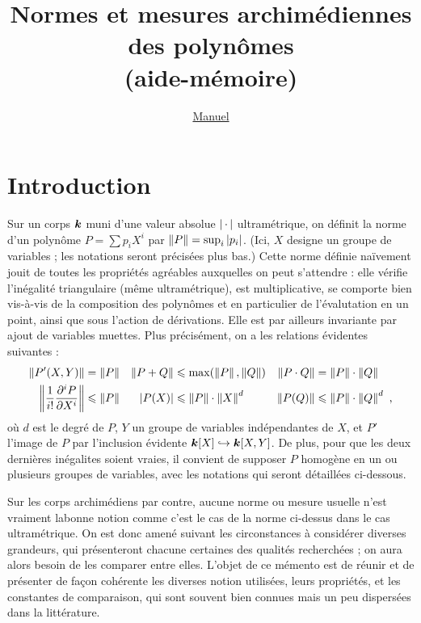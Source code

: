 \documentclass[11pt, twoside, a4paper]{article}
\author{\href{http://math.jussieu.fr/~mpg/}{Manuel \bsc{Pégourié-Gonnard}}}
\title{Normes et mesures archimédiennes des polynômes \\ (aide-mémoire)}
\begin{document}
\maketitle

\section*{Introduction}

Sur un corps $\boldsymbol{k}$ muni d'une valeur absolue $\left\lvert{\,\cdot\,}\right\rvert$ ultramétrique, on
définit la norme d'un polynôme $P = \sum p_i X^i$ par $\left\lVert P\right\rVert = \sup_i
\left\lvert p_i\right\rvert$. (Ici, $X$ designe un groupe de variables ; les notations seront
précisées plus bas.) Cette norme définie naïvement jouit de toutes les
propriétés agréables auxquelles on peut s'attendre : elle vérifie l'inégalité
triangulaire (même ultramétrique), est multiplicative, se comporte bien
vis-à-vis de la composition des polynômes et en particulier de l'évalutation
en un point, ainsi que sous l'action de dérivations. Elle est par ailleurs
invariante par ajout de variables muettes. Plus précisément, on a les
relations évidentes suivantes :
\begin{align*}
  \left\lVert P'(X, Y)\right\rVert 
  & = \left\lVert P\right\rVert 	
  & 
  \left\lVert P+Q\right\rVert 
  & \leqslant \max (\left\lVert P\right\rVert, \left\lVert Q\right\rVert)	
  &
  \left\lVert P\cdot Q\right\rVert 
  & = \left\lVert P\right\rVert \cdot \left\lVert Q\right\rVert
  \\
  \left\lVert \frac{1}{i!} \frac {\partial^i P} {\partial X^i} \right\rVert 
  & \leqslant \left\lVert P\right\rVert 
  & 
  \left\lvert P(X)\right\rvert 
  & \leqslant \left\lVert P\right\rVert \cdot \left\lVert X\right\rVert^d 	
  & 
  \left\lVert P(Q)\right\rVert 
  & \leqslant \left\lVert P\right\rVert \cdot \left\lVert Q\right\rVert^d
  \text{ ,}
\end{align*}
où $d$ est le degré de $P$, $Y$ un groupe de variables indépendantes de $X$,
et $P'$ l'image de $P$ par l'inclusion évidente $\boldsymbol{k}[X] \hookrightarrow
\boldsymbol{k}[X, Y]$. De plus, pour que les deux dernières inégalites soient vraies, il
convient de supposer $P$ homogène en un ou plusieurs groupes de variables,
avec les notations qui seront détaillées ci-dessous.

Sur les corps archimédiens par contre, aucune norme ou mesure usuelle n'est
vraiment \og la\fg bonne notion comme c'est le cas de la norme ci-dessus dans
le cas ultramétrique. On est donc amené suivant les circonstances à considérer
diverses grandeurs, qui présenteront chacune certaines des qualités
recherchées ; on aura alors besoin de les comparer entre elles. L'objet de ce
mémento est de réunir et de présenter de façon cohérente les diverses notion
utilisées, leurs propriétés, et les constantes de comparaison, qui sont
souvent bien connues mais un peu dispersées dans la littérature.
\end{document}
